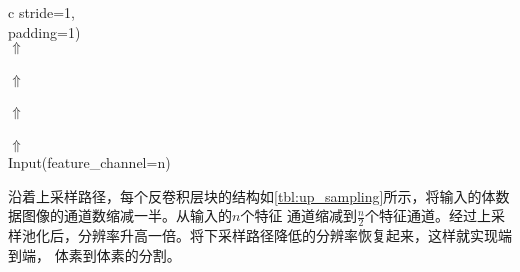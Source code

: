 \begin{table}[!ht]
\begin{minipage}{0.42\textwidth}
{\begin{tabular}{c}
{{                                                      stride=1, \\
                                                      padding=1)}} \\ \hline
                $\Uparrow$ \\ \hline
                 \\ \hline
                $\Uparrow$ \\ \hline
                 \\ \hline
                $\Uparrow$ \\ \hline
                 \\ \hline
                $\Uparrow$ \\
                Input(feature\_channel=n) \\
            \end{tabular}
        }
    \end{minipage}
\end{table}


沿着上采样路径，每个反卷积层块的结构如\autoref{tbl:up_sampling}所示，将输入的体数据图像的通道数缩减一半。从输入的$n$个特征
通道缩减到$\frac{n}{2}$个特征通道。经过上采样池化后，分辨率升高一倍。将下采样路径降低的分辨率恢复起来，这样就实现端到端，
体素到体素的分割。


